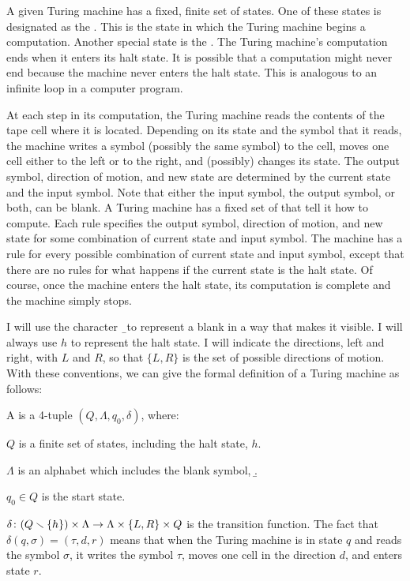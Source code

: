 A given Turing machine has a fixed, finite set of states.  One of
these states is designated as the .  This is the state in which the Turing machine begins a computation.
Another special state is the .  The Turing machine's computation ends when it enters its
halt state.  It is possible that a computation might never end because
the machine never enters the halt state.  This is analogous to an 
infinite loop in a computer program.

At each step in its computation,
the Turing machine reads the contents of the tape cell where it is located.
Depending on its state and the symbol that it reads, the machine
writes a symbol (possibly the same symbol) to the cell, moves one cell
either to the left or to the right, and (possibly) changes its state.
The output symbol, direction of motion, and new state are determined
by the current state and the input symbol.  Note that either the input
symbol, the output symbol, or both, can be blank. 
A Turing machine has a fixed set of 
that tell it how to compute.  Each rule
specifies the output symbol, direction of motion, and new state for
some combination of current state and input symbol.  The machine has
a rule for every possible combination of current state and input symbol,
except that there are no rules for what happens if the current state
is the halt state.  Of course, once the machine enters the halt state,
its computation is complete and the machine simply stops.

I will use the character \b\ to represent a blank in a way
that makes it visible.  I will always use $h$ to represent the halt
state.  I will indicate the directions, left and right, with
$L$ and $R$, so that $\{L,R\}$ is the set of possible directions of
motion.  With these conventions, we can give the formal definition of
a Turing machine as follows:

\begin{definition}
A  is a 4-tuple $(Q,\Lambda,q_0,\delta)$,
where:

$Q$ is a finite set of states, including the halt state, $h$.

$\Lambda$ is an alphabet which includes the blank symbol, \b.

$q_0\in Q$ is the start state.

$\delta\colon (Q\smallsetminus\{h\})\times\Lambda \to \Lambda\times 
\{L,R\}\times Q$ is the transition function.  The fact that
$\delta(q,\sigma)=(\tau,d,r)$ means that when the Turing machine is
in state $q$ and reads the symbol $\sigma$, it writes the symbol
$\tau$, moves one cell in the direction $d$, and enters state $r$.

\end{definition}


